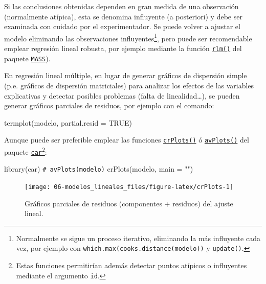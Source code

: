 \documentclass[
]{book}
\newenvironment{Shaded}{\begin{snugshade}}{\end{snugshade}}
\newcommand{\AttributeTok}[1]{\textcolor[rgb]{0.77,0.63,0.00}{#1}}
\newcommand{\CommentTok}[1]{\textcolor[rgb]{0.56,0.35,0.01}{\textit{#1}}}
\newcommand{\ConstantTok}[1]{\textcolor[rgb]{0.00,0.00,0.00}{#1}}
\newcommand{\FunctionTok}[1]{\textcolor[rgb]{0.00,0.00,0.00}{#1}}
\newcommand{\NormalTok}[1]{#1}
\newcommand{\StringTok}[1]{\textcolor[rgb]{0.31,0.60,0.02}{#1}}
\theoremstyle{break}
\theoremstyle{nonumberplain}
\renewcommand{\CommentTok}[1]{\textcolor[rgb]{0.41,0.41,0.41}{\texttt{#1}}}
\begin{document}
Si las conclusiones obtenidas dependen en gran medida de una observación (normalmente atípica), esta se denomina influyente (a posteriori) y debe ser examinada con cuidado por el experimentador.
Se puede volver a ajustar el modelo eliminando las observaciones influyentes\footnote{Normalmente se sigue un proceso iterativo, eliminando la más influyente cada vez, por ejemplo con \texttt{which.max(cooks.distance(modelo))} y \texttt{update()}.},
pero puede ser recomendable emplear regresión lineal robusta, por ejemplo mediante la función \href{https://rdrr.io/pkg/MASS/man/rlm.html}{\texttt{rlm()}} del paquete \href{https://CRAN.R-project.org/package=MASS}{\texttt{MASS}}).

En regresión lineal múltiple, en lugar de generar gráficos de dispersión simple
(p.e. gráficos de dispersión matriciales) para analizar los efectos de las variables explicativas y detectar posibles problemas (falta de linealidad\ldots), se pueden generar gráficos parciales de residuos, por ejemplo con el comando:

\begin{Shaded}
\begin{Highlighting}[]
\FunctionTok{termplot}\NormalTok{(modelo, }\AttributeTok{partial.resid =} \ConstantTok{TRUE}\NormalTok{)}
\end{Highlighting}
\end{Shaded}

Aunque puede ser preferible emplear las funciones \href{https://rdrr.io/pkg/car/man/crPlots.html}{\texttt{crPlots()}} ó \href{https://rdrr.io/pkg/car/man/avPlots.html}{\texttt{avPlots()}} del paquete \href{https://CRAN.R-project.org/package=car}{\texttt{car}}\footnote{Estas funciones permitirían además detectar puntos atípicos o influyentes
  mediante el argumento \texttt{id}.}:

\begin{Shaded}
\begin{Highlighting}[]
\FunctionTok{library}\NormalTok{(car)}
\CommentTok{\# avPlots(modelo)}
\FunctionTok{crPlots}\NormalTok{(modelo, }\AttributeTok{main =} \StringTok{""}\NormalTok{)}
\end{Highlighting}
\end{Shaded}

\begin{figure}[!htb]

{\centering \texttt{[image: 06-modelos\_lineales\_files/figure-latex/crPlots-1]} 

}

\caption{Gráficos parciales de residuos (componentes + residuos) del ajuste lineal.}\label{fig:crPlots}
\end{figure}
\end{document}
